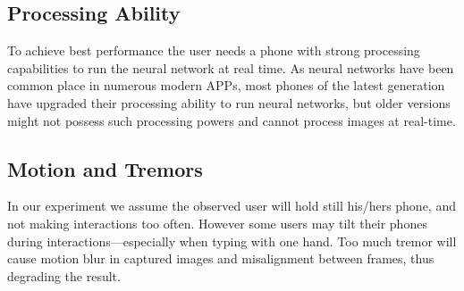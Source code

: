 \subsection{Processing Ability}
To achieve best performance the user needs a phone with strong processing capabilities to run the neural network at real time. As neural networks have been common place in numerous modern APPs, most phones of the latest generation have upgraded their processing ability to run neural networks, but older versions might not possess such processing powers and cannot process images at real-time.
\subsection{Motion and Tremors}
In our experiment we assume the observed user will hold still his/hers phone, and not making interactions too often. However some users may tilt their phones during interactions—especially when typing with one hand. Too much tremor will cause motion blur in captured images and misalignment between frames, thus degrading the result.




